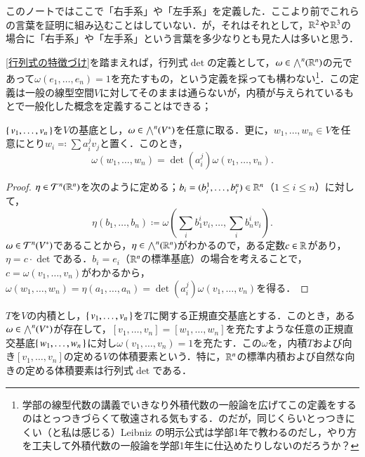 \begin{dig}
このノートではここで「右手系」や「左手系」を定義した．ここより前でこれらの言葉を証明に組み込むことはしていない．が，それはそれとして，$\mathbb{R}^2$や$\mathbb{R}^3$の場合に「右手系」や「左手系」という言葉を多少なりとも見た人は多いと思う．
\end{dig}

\cref{行列式の特徴づけ}を踏まえれば，行列式$\det$の定義として，$\omega \in \bigwedge^n(\mathbb{R}^n)$の元であって$\omega(e_1, \dots, e_n) = 1$を充たすもの，という定義を採っても構わない\footnote{学部の線型代数の講義でいきなり外積代数の一般論を広げてこの定義をするのはとっつきづらくて敬遠される気もする．のだが，同じくらいとっつきにくい（と私は感じる）Leibniz の明示公式は学部1年で教わるのだし，やり方を工夫して外積代数の一般論を学部1年生に仕込めたりしないのだろうか？}．この定義は一般の線型空間$V$に対してそのままは通らないが，内積が与えられているもとで一般化した概念を定義することはできる；

\begin{lem}\label{最高次交代テンソルの変換則}
$\set{v_1, \dots, v_n}$を$V$の基底とし，$\omega \in \bigwedge^n(V^*)$を任意に取る．更に，$w_1, \dots, w_n \in V$を任意にとり$w_i \eqqcolon \sum a_i^j v_j$と置く．このとき，
\begin{equation}
\omega(w_1, \dots, w_n) = \det \left( a_i^j \right) \omega(v_1, \dots, v_n).
\end{equation}
\end{lem}

\begin{proof}
$\eta \in \mathcal{T}^n(\mathbb{R}^n)$を次のように定める；$b_i = (b_i^1, \dots, b_i^n) \in \mathbb{R}^n$（$1 \leq i \leq n$）に対して，
\begin{equation}
\eta (b_1, \dots, b_n) \coloneqq \omega \left(\sum_i b_1^i v_i, \dots, \sum_i b_n^i v_i \right).
\end{equation}$\omega \in \mathcal{T}^n(V^*)$であることから，$\eta \in \bigwedge^n(\mathbb{R}^n)$がわかるので，ある定数$c \in \mathbb{R}$があり，$\eta = c \cdot \det$である．$b_i = e_i$（$\mathbb{R}^n$の標準基底）の場合を考えることで，$c = \omega(v_1, \dots, v_n)$がわかるから，$\omega(w_1, \dots, w_n) = \eta (a_1, \dots, a_n) = \det \left( a_i^j \right) \omega(v_1, \dots, v_n)$を得る．
\end{proof}

\begin{thm}
$T$を$V$の内積とし，$\set{v_1, \dots, v_n}$を$T$に関する正規直交基底とする．このとき，ある$\omega \in \bigwedge^n(V^*)$が存在して，$[v_1, \dots, v_n] = [w_1, \dots, w_n]$を充たすような任意の正規直交基底$\set{w_1, \dots, w_n}$に対し$\omega (v_1, \dots, v_n) = 1$を充たす．この$\omega$を，内積$T$および向き$[v_1, \dots, v_n]$の定める$V$の体積要素という．特に，$\mathbb{R}^n$の標準内積および自然な向きの定める体積要素は行列式$\det$である．
\end{thm}

